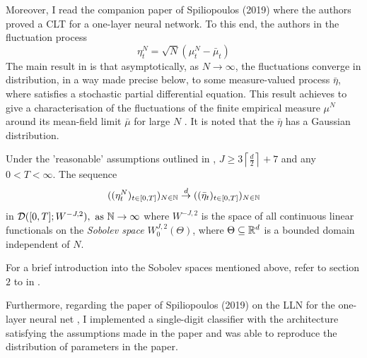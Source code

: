\documentclass{article}
\begin{document}
Moreover, I read the companion paper of Spiliopoulos (2019) \cite{sirignano2019meanfieldanalysisclt} where the authors proved a CLT for a one-layer neural network. To this end, the authors in \cite{sirignano2019meanfieldanalysisclt} the fluctuation process 
\begin{equation}
	\eta^{N}_t = \sqrt{N}(\mu^{N}_{t}-\bar{\mu}_{t})
\end{equation}
The main result in \cite{sirignano2019meanfieldanalysisclt} is that asymptotically, as $ N\to \infty$, the fluctuations converge in distribution, in a way made precise below, to some measure-valued process $ \bar{\eta}$, where satisfies a stochastic partial differential equation. This result achieves to give a characterisation of the fluctuations of the finite empirical measure $ \mu^{N}$ around its mean-field limit $ \bar{\mu}$ for large $ N$ . It is noted that the $ \bar{\eta}$
has a Gaussian distribution.

\begin{theorem}\label{thm: spiliopoulos CLT}
	Under the 'reasonable' assumptions outlined in \cite{sirignano2019meanfieldanalysisclt}, $J \geq 3\left \lceil \frac{d}{2}\right\rceil+7$ and any $ 0<T<\infty$. The sequence
	\begin{equation} 
		((\eta^{N}_{t})_{t\in [0,T]})_{N\in \mathbb{N}}\stackrel{d}{\to} ((\bar{\eta}_{t})_{t\in [0,T]})_{N\in \mathbb{N}}
	\end{equation}
	in $\mathcal{D}([0,T];W^{-J,2}), \text{ as } \mathbb{N}\to \infty$ where $ W^{-J,2}$ is the space of all continuous linear functionals on the \textit{Sobolev space} $ W^{J,2}_{0}(\Theta)$, where $ \Theta\subseteq\mathbb{R}^{d}$ is a bounded domain independent of $ N$.
\end{theorem}

\begin{remark}
	For a brief introduction into the Sobolev spaces mentioned above, refer to section $ 2$ to in \cite{sirignano2019meanfieldanalysisclt}.
\end{remark}


Furthermore, regarding the paper of Spiliopoulos (2019) on the LLN for the one-layer neural net \cite{sirignano2019meanfieldanalysislln}, I implemented a single-digit classifier with the architecture satisfying the assumptions made in the paper and was able to reproduce the distribution of parameters in the paper.
\end{document}
